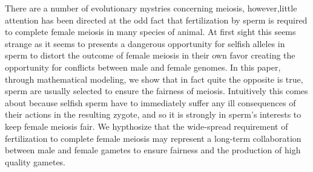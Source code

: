
There are a number of evolutionary mystries concerning meiosis, however,little attention has been directed at the odd fact that fertilization by sperm is required to complete female meiosis in many species of animal. 
At first sight this seems strange as it seems to presents a dangerous opportunity for selfish alleles in sperm to distort the outcome of female meiosis in their own favor creating the opportunity for conflicts between male and female genomes. In this paper, through mathematical modeling, we show that in fact quite the opposite is true, sperm are usually selected to ensure the fairness of meiosis.
Intuitively this comes about because selfish sperm have to immediately suffer any ill consequences of their actions in the resulting zygote, and so it is strongly in sperm's interests to keep female meiosis fair.
We hypthosize that the wide-spread requirement of fertilization to complete female meiosis may represent a long-term 
collaboration between male and female gametes to ensure fairness and the production of high quality gametes.
